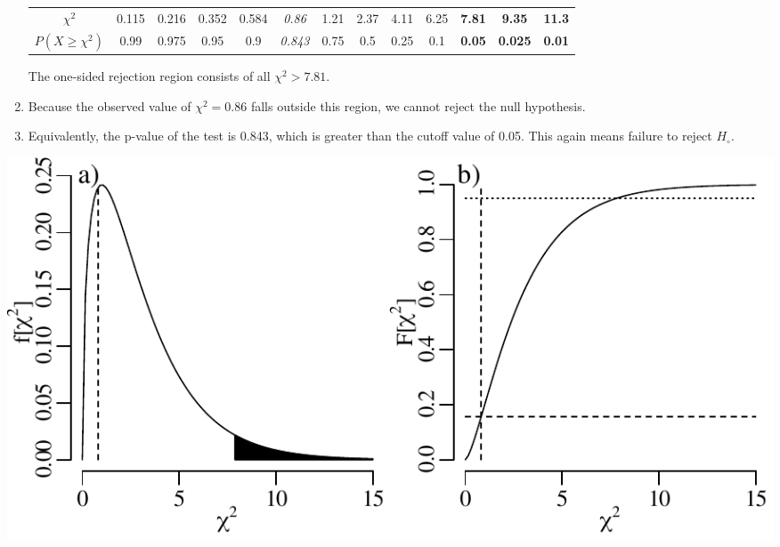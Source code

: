 \begin{enumerate}
  \begin{center}
    \begin{tabular}{c|c@{\gap}c@{\gap}c@{\gap}c@{\gap}
        c@{\gap}c@{\gap}c@{\gap}c@{\gap}c@{\gap}c@{\gap}c@{\gap}c}
      $\chi^2$ & 0.115 & 0.216 & 0.352 & 0.584 & \emph{0.86} &
      1.21 & 2.37 & 4.11 & 6.25 & \textbf{7.81} &
      \textbf{9.35} & \textbf{11.3} \\
      $P(X\geq{\chi^2})$ & 0.99 & 0.975 & 0.95 & 0.9 & \emph{0.843} & 
      0.75 & 0.5 & 0.25 & 0.1 & \textbf{0.05} &
      \textbf{0.025} & \textbf{0.01}
    \end{tabular}
  \end{center}

  The one-sided rejection region consists of all $\chi^2>{7.81}$.

\item Because the observed value of $\chi^2=0.86$ falls outside this
  region, we cannot reject the null hypothesis.

\item Equivalently, the p-value of the test is 0.843, which is greater
  than the cutoff value of 0.05.  This again means failure to reject
  $H_\circ$.
  
\end{enumerate}

\noindent\begin{minipage}[t][][b]{.6\textwidth}
  \includegraphics[width=\textwidth]{../figures/chi22.pdf}\\
\end{minipage}
\begin{minipage}[t][][t]{.4\textwidth}
  \label{fig:chi22}
\end{minipage}

